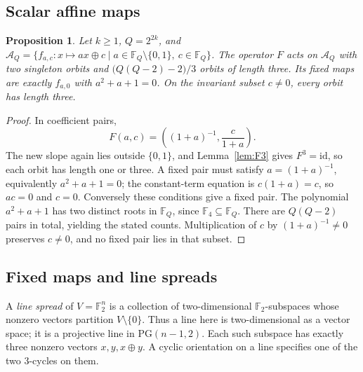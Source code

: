 \documentclass[11pt]{article}
\newtheorem{proposition}[theorem]{Proposition}
\begin{document}
\subsection*{Scalar affine maps}
\begin{proposition}\label{prop:F-orbits}
Let $k\ge1$, $Q=2^{2k}$, and
$\mathcal A_Q=\{f_{a,c}:x\mapsto ax\oplus c\mid a\in\mathbb F_Q\setminus\{0,1\},\ c\in\mathbb F_Q\}$.
The operator $F$ acts on $\mathcal A_Q$ with two singleton orbits and
$\bigl(Q(Q-2)-2\bigr)/3$ orbits of length three. Its fixed maps are exactly
$f_{a,0}$ with $a^2+a+1=0$. On the invariant subset $c\ne0$, every orbit
has length three.
\end{proposition}
\begin{proof}
In coefficient pairs,
\[
F(a,c)=\left((1+a)^{-1},\frac{c}{1+a}\right).
\]
The new slope again lies outside $\{0,1\}$, and Lemma~\ref{lem:F3} gives
$F^3=\mathrm{id}$, so each orbit has length one or three. A fixed pair
must satisfy $a=(1+a)^{-1}$, equivalently $a^2+a+1=0$; the constant-term
equation is $c(1+a)=c$, so $ac=0$ and $c=0$.
Conversely these conditions give a fixed pair. The polynomial $a^2+a+1$
has two distinct roots in $\mathbb F_Q$, since $\mathbb F_4\subseteq\mathbb F_Q$.
There are $Q(Q-2)$ pairs in total, yielding the stated counts.
Multiplication of $c$ by $(1+a)^{-1}\ne0$ preserves $c\ne0$, and no fixed
pair lies in that subset.
\end{proof}
\subsection*{Fixed maps and line spreads}
A \emph{line spread} of $V=\mathbb F_2^n$ is a collection of two-dimensional
$\mathbb F_2$-subspaces whose nonzero vectors partition $V\setminus\{0\}$.
Thus a line here is two-dimensional as a vector space; it is a projective
line in $\mathrm{PG}(n-1,2)$.
Each such subspace has exactly three nonzero vectors $x,y,x\oplus y$.
A cyclic orientation on a line specifies one of the two $3$-cycles on them.
\end{document}
